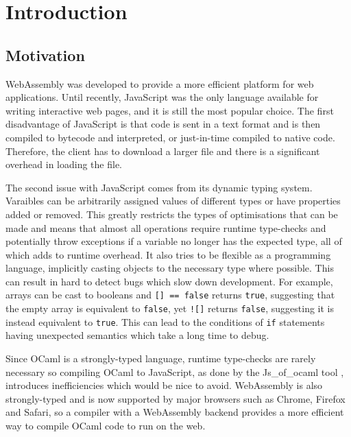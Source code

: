 \chapter{Introduction}

\section{Motivation}
WebAssembly was developed to provide a more efficient platform for web applications. Until recently, JavaScript was the only language available for writing interactive web pages, and it is still the most popular choice. The first disadvantage of JavaScript is that code is sent in a text format and is then compiled to bytecode  and interpreted, or just-in-time compiled to native code. Therefore, the client has to download a larger file and there is a significant overhead in loading the file. 

The second issue with JavaScript comes from its dynamic typing system. Varaibles can be arbitrarily assigned values of different types or have properties added or removed. This greatly restricts the types of optimisations that can be made and means that almost all operations require runtime type-checks and potentially throw exceptions if a variable no longer has the expected type, all of which adds to runtime overhead. It also tries to be flexible as a programming language, implicitly casting objects to the necessary type where possible. This can result in hard to detect bugs which slow down development. For example, arrays can be cast to booleans and \verb|[] == false| returns \verb|true|, suggesting that the empty array is equivalent to \verb|false|, yet \verb|![]| returns \verb|false|, suggesting it is instead equivalent to \verb|true|. This can lead to the conditions of \verb|if| statements having unexpected semantics which take a long time to debug. 

Since OCaml is a strongly-typed language, runtime type-checks are rarely necessary so compiling OCaml to JavaScript, as done by the Js\_of\_ocaml tool \cite{jsofocaml}, introduces inefficiencies which would be nice to avoid. WebAssembly is also strongly-typed and is now supported by major browsers such as Chrome, Firefox and Safari, so a compiler with a WebAssembly backend provides a more efficient way to compile OCaml code to run on the web. 

